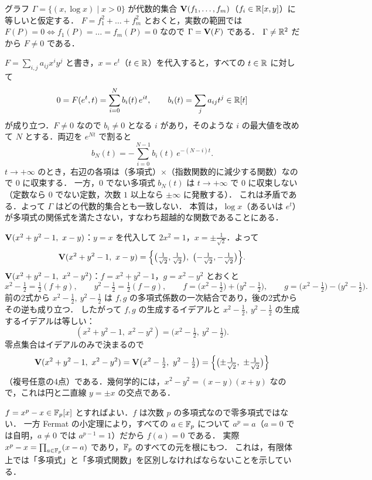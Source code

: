 グラフ $\Gamma=\{(x,\log x)\mid x>0\}$ が代数的集合 $\mathbf{V}(f_1,\dots,f_m)$（$f_i\in\mathbb{R}[x,y]$）に等しいと仮定する．
$F=f_1^2+\dots+f_m^2$ とおくと，実数の範囲では $F(P)=0\iff f_1(P)=\dots=f_m(P)=0$ なので $\Gamma=\mathbf{V}(F)$ である．
$\Gamma\ne\mathbb{R}^2$ だから $F\ne0$ である．

$F=\sum_{i,j}a_{ij}x^iy^j$ と書き，$x=e^t$（$t\in\mathbb{R}$）を代入すると，すべての $t\in\mathbb{R}$ に対して
\[
  0=F(e^t,t)=\sum_{i=0}^{N}b_i(t)\,e^{it},\qquad b_i(t)=\sum_ja_{ij}t^j\in\mathbb{R}[t]
\]
が成り立つ．$F\ne0$ なので $b_i\ne0$ となる $i$ があり，そのような $i$ の最大値を改めて $N$ とする．両辺を $e^{Nt}$ で割ると
\[
  b_N(t)=-\sum_{i=0}^{N-1}b_i(t)\,e^{-(N-i)t}.
\]
$t\to+\infty$ のとき，右辺の各項は（多項式）$\times$（指数関数的に減少する関数）なので $0$ に収束する．
一方，$0$ でない多項式 $b_N(t)$ は $t\to+\infty$ で $0$ に収束しない（定数なら $0$ でない定数，次数 $1$ 以上なら $\pm\infty$ に発散する）．
これは矛盾である．よって $\Gamma$ はどの代数的集合とも一致しない．
本質は，$\log x$（あるいは $e^t$）が多項式の関係式を満たさない，すなわち超越的な関数であることにある．

$\Zero(x^2+y^2-1,\ x-y)$：$y=x$ を代入して $2x^2=1$，$x=\pm\frac1{\sqrt2}$．よって
\[
  \Zero(x^2+y^2-1,\ x-y)=\Bigl\{\bigl(\tfrac1{\sqrt2},\tfrac1{\sqrt2}\bigr),\ \bigl(-\tfrac1{\sqrt2},-\tfrac1{\sqrt2}\bigr)\Bigr\}.
\]
$\Zero(x^2+y^2-1,\ x^2-y^2)$：$f=x^2+y^2-1$，$g=x^2-y^2$ とおくと
\[
  x^2-\tfrac12=\tfrac12(f+g),\qquad y^2-\tfrac12=\tfrac12(f-g),\qquad
  f=\bigl(x^2-\tfrac12\bigr)+\bigl(y^2-\tfrac12\bigr),\qquad g=\bigl(x^2-\tfrac12\bigr)-\bigl(y^2-\tfrac12\bigr).
\]
前の2式から $x^2-\frac12,\ y^2-\frac12$ は $f,g$ の多項式係数の一次結合であり，後の2式からその逆も成り立つ．
したがって $f,g$ の生成するイデアルと $x^2-\frac12,\ y^2-\frac12$ の生成するイデアルは等しい：
\[
  (x^2+y^2-1,\ x^2-y^2)=\bigl(x^2-\tfrac12,\ y^2-\tfrac12\bigr).
\]
零点集合はイデアルのみで決まるので
\[
  \Zero(x^2+y^2-1,\ x^2-y^2)=\Zero\bigl(x^2-\tfrac12,\ y^2-\tfrac12\bigr)=\Bigl\{\bigl(\pm\tfrac1{\sqrt2},\ \pm\tfrac1{\sqrt2}\bigr)\Bigr\}
\]
（複号任意の4点）である．幾何学的には，$x^2-y^2=(x-y)(x+y)$ なので，これは円と二直線 $y=\pm x$ の交点である．

$f=x^p-x\in\mathbb{F}_p[x]$ とすればよい．$f$ は次数 $p$ の多項式なので零多項式ではない．
一方 Fermat の小定理により，すべての $a\in\mathbb{F}_p$ について $a^p=a$（$a=0$ では自明，$a\ne0$ では $a^{p-1}=1$）だから $f(a)=0$ である．
実際 $x^p-x=\prod_{a\in\mathbb{F}_p}(x-a)$ であり，$\mathbb{F}_p$ のすべての元を根にもつ．
これは，有限体上では「多項式」と「多項式関数」を区別しなければならないことを示している．

